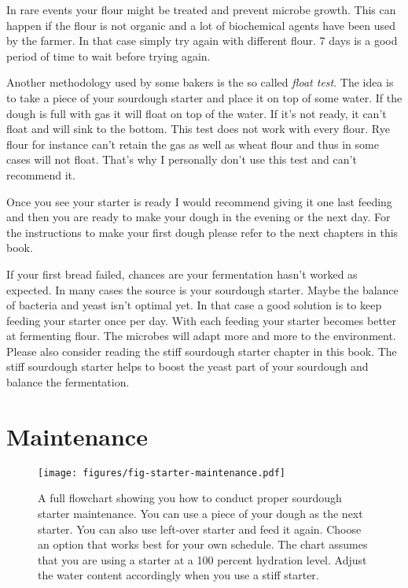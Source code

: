 In rare events your flour might be treated and prevent microbe growth.
This can happen if the flour is not organic and a lot of biochemical
agents have been used by the farmer. In that case simply try again
with different flour. 7 days is a good period of time to wait before
trying again.

Another methodology used by some bakers is the so called \emph{float test}.
The idea is to take a piece of your sourdough starter and place it
on top of some water. If the dough is full with gas it will float
on top of the water. If it's not ready, it can't float and will
sink to the bottom. This test does not work with every flour.
Rye flour for instance can't retain the gas as well as wheat flour
and thus in some cases will not float. That's why I personally
don't use this test and can't recommend it.

Once you see your starter is ready I would recommend giving it
one last feeding and then you are ready to make your dough in the
evening or the next day. For the instructions to make your
first dough please refer to the next chapters in this book.

If your first bread failed, chances are your fermentation hasn't
worked as expected. In many cases the source is your sourdough starter. Maybe
the balance of bacteria and yeast isn't optimal yet. In that case a good
solution is to keep feeding your starter once per day. With each feeding your
starter becomes better at fermenting flour. The microbes will adapt more and
more to the environment. Please also consider reading the stiff sourdough starter
chapter in this book. The stiff sourdough starter helps to boost the
yeast part of your sourdough and balance the fermentation.

\section{Maintenance}

\begin{figure}[!htb]
  \texttt{[image: figures/fig-starter-maintenance.pdf]}
  \caption{A full flowchart showing you how to conduct proper sourdough starter maintenance. You can use a
  piece of your dough as the next starter. You can also use left-over starter and feed it again. Choose an
  option that works best for your own schedule. The chart assumes that you are using a starter at a 100 percent
  hydration level. Adjust the water content accordingly when you use a stiff starter.}
  \label{fig:sourdough-maintenance-process}
\end{figure}

